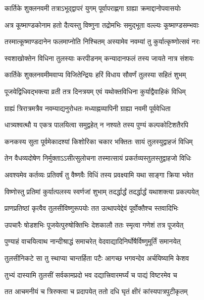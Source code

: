 \twolineshloka
{कार्तिके शुक्लनवमी तत्राऽभूद्द्वापरं युगम्}
{पूर्वापराह्णगा ग्राह्या क्रमाद्दानोपवासयोः} %

\twolineshloka
{अत्र कूष्माण्डकोनाम हतो दैत्यस्तु विष्णुना}
{तद्रोमभिः समुद्भूता वल्ल्यः कूष्माण्डसम्भवाः} %

\twolineshloka
{तस्मात्कूष्माण्डदानेन फलमाप्नोति निश्चितम्}
{अस्यामेव नवम्यां तु कुर्यात्कृष्णोत्सवं नरः} %

\twolineshloka
{स्वशाखोक्तेन विधिना तुलस्याः करपीडनम्}
{कन्यादानफलं तस्य जायते नात्र संशयः} %

\twolineshloka
{कार्तिके शुक्लनवमीमवाप्य विजितेन्द्रियः}
{हरिं विधाय सौवर्णं तुलस्या सहितं शुभम्} %

\twolineshloka
{पूजयेद्विधिवद्भक्त्या व्रती तत्र दिनत्रयम्}
{एवं यथोक्तविधिना कुर्याद्वैवाहिकं विधिम्} %

\twolineshloka
{ग्राह्यं त्रिरात्रमत्रैव नवम्याद्यनुरोधतः}
{मध्याह्नव्यापिनी ग्राह्या नवमी पूर्ववेधिता} %

\twolineshloka
{धात्र्यश्वत्थौ य एकत्र पालयित्वा समुद्वहेत्}
{न नश्यते तस्य पुण्यं कल्पकोटिशतैरपि} %

\twolineshloka
{कनकस्य सुता पूर्वमेकादश्यां किशोरिका}
{चकार भक्तितः सायं तुलस्युद्वाहजं विधिम्} %

\twolineshloka
{तेन वैधव्यदोषेण निर्मुक्ताऽऽसीत्सुलोचना}
{तस्मात्सायं प्रकर्तव्यस्तुलस्तुद्वाहजो विधिः} %

\twolineshloka
{अवश्यमेव कर्तव्यः प्रतिवर्षं तु वैष्णवैः}
{विधिं तस्य प्रवक्ष्यामि यथा साङ्गा क्रिया भवेत} %

\twolineshloka
{विष्णोस्तु प्रतिमां कुर्यात्पलस्य स्वर्णजां शुभाम्}
{तदर्द्धार्द्धं तदर्द्धार्द्धं यथाशक्त्या प्रकल्पयेत्} %

\twolineshloka
{प्राणप्रतिष्ठां कृत्वैव तुलसीविष्णुरूपयोः}
{तत उत्थापयेद्देवं पूर्वोक्तैश्च स्तवादिभिः} %

\twolineshloka
{उपचारैः षोडशभिः पूजयेत्पुरुषोक्तिभिः}
{देशकालौ ततः स्मृत्वा गणेशं तत्र पूजयेत्} %

\twolineshloka
{पुण्याहं वाचयित्वाथ नान्दीश्राद्धं समाचरेत्}
{वेदवाद्यादिनिर्घोषैर्विष्णुमूर्तिं समानयेत्} %

\twolineshloka
{तुलसीनिकटे सा तु स्थाप्या चान्तर्हिता पटैः}
{आगच्छ भगवन्देव अर्चयिष्यामि केशव} %

\twolineshloka
{तुभ्यं दास्यामि तुलसीं सर्वकामप्रदो भव}
{दद्यात्त्रिवारमर्घ्यं च पाद्यं विष्टरमेव च} %

\twolineshloka
{तत आचमनीयं च त्रिरुक्त्वा च प्रदापयेत्}
{ततो दधि घृतं क्षीरं कांस्यपात्रपुटीकृतम्} %

